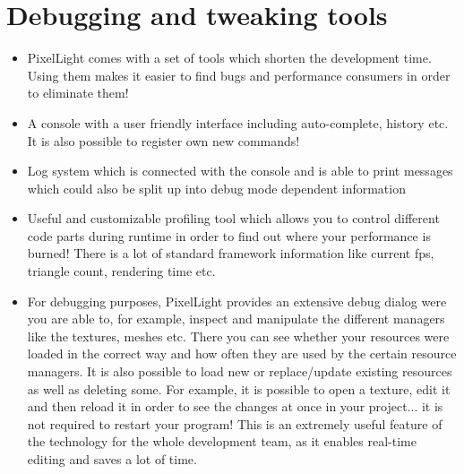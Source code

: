 \section{Debugging and tweaking tools}
\begin{itemize}
\item{PixelLight comes with a set of tools which shorten the development time. Using them makes it easier to find bugs and performance consumers in order to eliminate them!}
\item{A console with a user friendly interface including auto-complete, history etc. It is also possible to register own new commands!}
\item{Log system which is connected with the console and is able to print messages which could also be split up into debug mode dependent information}
\item{Useful and customizable profiling tool which allows you to control different code parts during runtime in order to find out where your performance is burned! There is a lot of standard framework information like current fps, triangle count, rendering time etc.}
\item{For debugging purposes, PixelLight provides an extensive debug dialog were you are able to, for example, inspect and manipulate the different managers like the textures, meshes etc. There you can see whether your resources were loaded in the correct way and how often they are used by the certain resource managers. It is also possible to load new or replace/update existing resources as well as deleting some. For example, it is possible to open a texture, edit it and then reload it in order to see the changes at once in your project... it is not required to restart your program! This is an extremely useful feature of the technology for the whole development team, as it enables real-time editing and saves a lot of time.}
\end{itemize}
\newpage
